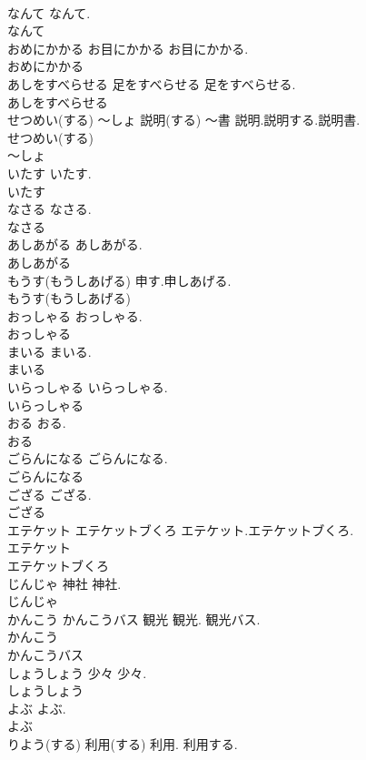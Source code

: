 \documentclass[8pt]{extreport}
\begin{document}
\begin{CJK}{UTF8}{min}
\\	なんて		なんて.	
\\	なんて
\\	おめにかかる	お目にかかる	お目にかかる.	
\\	おめにかかる
\\	あしをすべらせる	足をすべらせる	足をすべらせる.	
\\	あしをすべらせる
\\	せつめい(する) ～しょ	説明(する) ～書	説明.説明する.説明書.	
\\	せつめい(する)
\\	～しょ
\\	いたす		いたす.	
\\	いたす
\\	なさる		なさる.	
\\	なさる
\\	あしあがる		あしあがる.	
\\	あしあがる
\\	もうす(もうしあげる)		申す.申しあげる.	
\\	もうす(もうしあげる)
\\	おっしゃる		おっしゃる.	
\\	おっしゃる
\\	まいる		まいる.	
\\	まいる
\\	いらっしゃる		いらっしゃる.	
\\	いらっしゃる
\\	おる		おる.	
\\	おる
\\	ごらんになる		ごらんになる.	
\\	ごらんになる
\\	ござる		ござる.	
\\	ござる
\\	エテケット エテケットブくろ		エテケット.エテケットブくろ.	
\\	エテケット
\\	エテケットブくろ
\\	じんじゃ	神社	神社.	
\\	じんじゃ
\\	かんこう かんこうバス	観光	観光. 観光バス.	
\\	かんこう
\\	かんこうバス
\\	しょうしょう	少々	少々.	
\\	しょうしょう
\\	よぶ		よぶ.	
\\	よぶ
\\	りよう(する)	利用(する)	利用. 利用する.	

\end{CJK}
\end{document}
